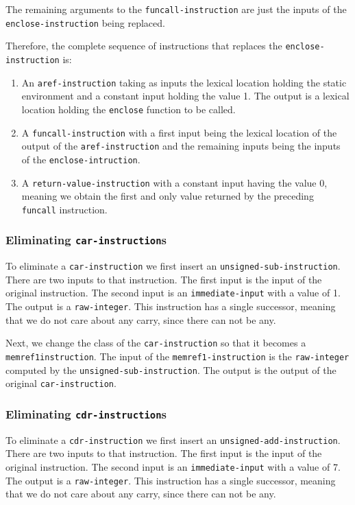 The remaining arguments to the \texttt{funcall-instruction} are just
the inputs of the \texttt{enclose-instruction} being replaced.

Therefore, the complete sequence of instructions that replaces the
\texttt{enclose-instruction} is:

\begin{enumerate}
\item An \texttt{aref-instruction} taking as inputs the lexical
  location holding the static environment and a constant input holding
  the value 1.  The output is a lexical location holding the
  \texttt{enclose} function to be called.
\item A \texttt{funcall-instruction} with a first input being the
  lexical location of the output of the \texttt{aref-instruction} and
  the remaining inputs being the inputs of the
  \texttt{enclose-intruction}.
\item A \texttt{return-value-instruction} with a constant input having
  the value $0$, meaning we obtain the first and only value returned
  by the preceding \texttt{funcall} instruction.
\end{enumerate}

\subsubsection{Eliminating \texttt{car-instruction}s}

To eliminate a \texttt{car-instruction} we first insert an
\texttt{unsigned-sub-instruction}.  There are two inputs to that
instruction.  The first input is the input of the original
instruction.  The second input is an \texttt{immediate-input} with a
value of 1.  The output is a \texttt{raw-integer}.  This instruction
has a single successor, meaning that we do not care about any carry,
since there can not be any.

Next, we change the class of the \texttt{car-instruction} so that it
becomes a \texttt{memref1\-instruction}.  The input of the
\texttt{memref1-instruction} is the \texttt{raw-integer} computed by
the \texttt{unsigned-sub-instruction}.  The output is the output of
the original \texttt{car-instruction}.

\subsubsection{Eliminating \texttt{cdr-instruction}s}

To eliminate a \texttt{cdr-instruction} we first insert an
\texttt{unsigned-add-instruction}.  There are two inputs to that
instruction.  The first input is the input of the original
instruction.  The second input is an \texttt{immediate-input} with a
value of 7.  The output is a \texttt{raw-integer}.  This instruction
has a single successor, meaning that we do not care about any carry,
since there can not be any.


